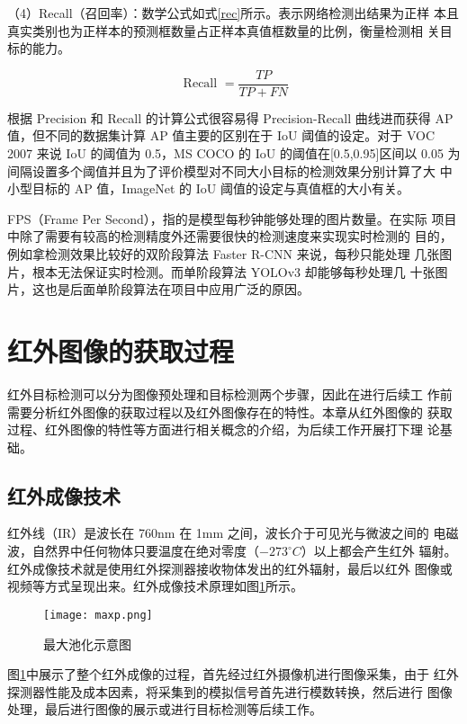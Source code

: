 （4）Recall（召回率）：数学公式如式\ref{rec}所示。表示网络检测出结果为正样
本且真实类别也为正样本的预测框数量占正样本真值框数量的比例，衡量检测相
关目标的能力。

\begin{equation}
     \text { Recall }=\frac{T P}{T P+F N}
    \label{rec}
\end{equation}

根据 Precision 和 Recall 的计算公式很容易得 Precision-Recall 曲线进而获得
AP 值，但不同的数据集计算 AP 值主要的区别在于 IoU 阈值的设定。对于 VOC
2007 来说 IoU 的阈值为 0.5，MS COCO 的 IoU 的阈值在[0.5,0.95]区间以 0.05 为
间隔设置多个阈值并且为了评价模型对不同大小目标的检测效果分别计算了大
中小型目标的 AP 值，ImageNet 的 IoU 阈值的设定与真值框的大小有关。

FPS（Frame Per Second），指的是模型每秒钟能够处理的图片数量。在实际
项目中除了需要有较高的检测精度外还需要很快的检测速度来实现实时检测的
目的，例如拿检测效果比较好的双阶段算法 Faster R-CNN 来说，每秒只能处理
几张图片，根本无法保证实时检测。而单阶段算法 YOLOv3 却能够每秒处理几
十张图片，这也是后面单阶段算法在项目中应用广泛的原因。

\section{红外图像的获取过程}
红外目标检测可以分为图像预处理和目标检测两个步骤，因此在进行后续工
作前需要分析红外图像的获取过程以及红外图像存在的特性。本章从红外图像的
获取过程、红外图像的特性等方面进行相关概念的介绍，为后续工作开展打下理
论基础。
\subsection{红外成像技术}
红外线（IR）是波长在 760nm 在 1mm 之间，波长介于可见光与微波之间的
电磁波，自然界中任何物体只要温度在绝对零度（$-273 ^{\circ}C$）以上都会产生红外
辐射。红外成像技术就是使用红外探测器接收物体发出的红外辐射，最后以红外
图像或视频等方式呈现出来。红外成像技术原理如图\ref{infra}所示\cite{倪国强2008中国红外成像技术发展的若干思考}。

\begin{figure}[htbp]
    \centering
    \texttt{[image: maxp.png]}
    \caption{最大池化示意图}
    \label{infra}
\end{figure}

图\ref{infra}中展示了整个红外成像的过程，首先经过红外摄像机进行图像采集，由于
红外探测器性能及成本因素，将采集到的模拟信号首先进行模数转换，然后进行
图像处理，最后进行图像的展示或进行目标检测等后续工作。

